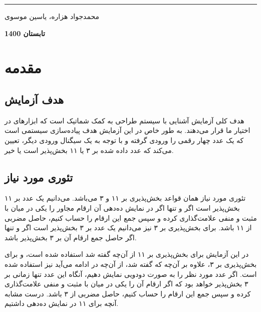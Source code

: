 \documentclass[12pt,onecolumn,a4paper,fleqn]{article}
\begin{document}
\begin{titlepage}
\begin{center}
			\noindent\rule[1ex]{\linewidth}{1pt}
			\vspace*{1.5cm}
			\begin{Large}
					محمدجواد هزاره، یاسین موسوی
					
					\vspace*{1.5cm}
					\textbf{
					تابستان 1400
					}
			\end{Large}			
		\end{center}
		\thispagestyle{empty}
	\end{titlepage}	
	\pagebreak
	
	\tableofcontents
	\thispagestyle{empty}
	\pagebreak
	\section{مقدمه}
	\subsection{هدف آزمایش}
	هدف کلی آزمایش آشنایی با سیستم طراحی به کمک شماتیک است که ابزارهای
	در اختیار ما قرار می‌دهند. به طور خاص در این آزمایش هدف پیاده‌سازی سیستمی است که یک عدد چهار رقمی
	را ورودی گرفته و با توجه به یک سیگنال ورودی دیگر، تعیین می‌کند که عدد داده شده بر ۳ یا ۱۱ بخش‌پذیر است یا خیر.
	\subsection{تئوری مورد نیاز}
	تئوری مورد نیاز همان قواعد بخش‌پذیری بر ۱۱ و ۳ می‌باشد. می‌دانیم یک عدد بر ۱۱ بخش‌پذیر است اگر و تنها اگر در نمایش ده‌دهی آن ارقام مجاور را یکی در میان با مثبت و منفی علامت‌گذاری کرده و سپس جمع این ارقام را حساب کنیم، حاصل مضربی از ۱۱ باشد. برای بخش‌پذیری بر ۳ نیز می‌دانیم یک عدد بر ۳ بخش‌پذیر است اگر و تنها اگر حاصل جمع ارقام آن بر ۳ بخش‌پذیر باشد.
	
	در این آزمایش برای بخش‌پذیری بر ۱۱ از آن‌چه گفته شد استفاده شده است، و برای بخش‌پذیری بر ۳، علاوه بر آن‌چه که گفته شد، از آن‌چه در ادامه می‌آید نیز استفاده شده است. اگر عدد مورد نظر را به صورت دودویی نمایش دهیم، آنگاه این عدد تنها زمانی بر ۳ بخش‌پذیر خواهد بود که اگر ارقام آن را یکی در میان با مثبت و منفی علامت‌گذاری کرده و سپس جمع این ارقام را حساب کنیم، حاصل مضربی از ۳ باشد. درست مشابه آنچه برای ۱۱ در نمایش ده‌دهی داشتیم.
\end{document}
